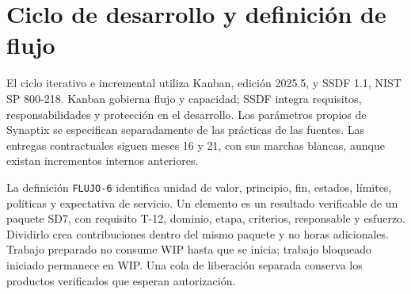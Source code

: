 \section{Ciclo de desarrollo y definición de flujo}
El ciclo iterativo e incremental utiliza Kanban, edición 2025.5, y SSDF 1.1, NIST SP 800-218. Kanban gobierna flujo y capacidad; SSDF integra requisitos, responsabilidades y protección en el desarrollo. Los parámetros propios de Synaptix se especifican separadamente de las prácticas de las fuentes. Las entregas contractuales siguen meses 16 y 21, con sus marchas blancas, aunque existan incrementos internos anteriores. \parencites[pp.~3--5]{sd6-kanban}[sec.~2; tabla~1]{sd6-ssdf}[art.~17, pp.~12--13]{sd6-ba}

La definición \texttt{FLUJO-6} identifica unidad de valor, principio, fin, estados, límites, políticas y expectativa de servicio. Un elemento es un resultado verificable de un paquete SD7, con requisito T-12, dominio, etapa, criterios, responsable y esfuerzo. Dividirlo crea contribuciones dentro del mismo paquete y no horas adicionales. Trabajo preparado no consume WIP hasta que se inicia; trabajo bloqueado iniciado permanece en WIP. Una cola de liberación separada conserva los productos verificados que esperan autorización.

